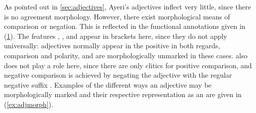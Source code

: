 As pointed out in \autoref{sec:adjectives}, Ayeri's adjectives inflect very
little, since there is no agreement morphology. However, there exist
morphological means of comparison or negation. This is reflected in the
functional annotations given in (\ref{ex:adjmorphlex}). The features \Deg{},
\Degdim{}, and \Neg{} appear in brackets here, since they do not apply
universally: adjectives normally appear in the positive in both regards,
comparison and polarity, and are morphologically unmarked in these cases.
\Degdim{} also does not play a role here, since there are only clitics for
positive comparison, and negative comparison is achieved by negating the
adjective with the regular negative suffix . Examples of the
different ways an adjective may be morphologically marked and their respective
representation as an \Avm{} are given in (\ref{ex:adjmorph}).

\begin{figure}[h]
\begin{morphlex}
\ex\label{ex:adjmorphlex}%
\xe
\end{morphlex}
\end{figure}

